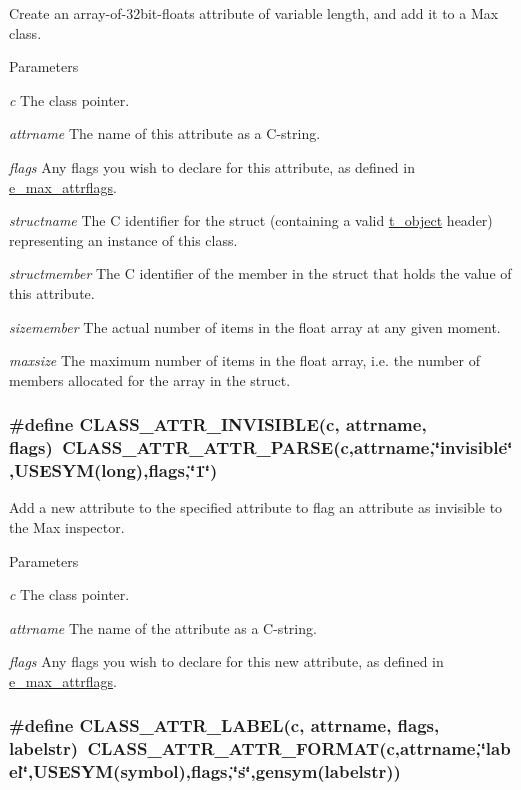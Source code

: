 Create an array-\/of-\/32bit-\/floats attribute of variable length, and add it to a Max class. 
\begin{DoxyParams}{Parameters}
\item[{\em c}]The class pointer. \item[{\em attrname}]The name of this attribute as a C-\/string. \item[{\em flags}]Any flags you wish to declare for this attribute, as defined in \hyperlink{group__attr_gaf296cfc6741bb19207f6ed8062809115}{e\_\-max\_\-attrflags}. \item[{\em structname}]The C identifier for the struct (containing a valid \hyperlink{structt__object}{t\_\-object} header) representing an instance of this class. \item[{\em structmember}]The C identifier of the member in the struct that holds the value of this attribute. \item[{\em sizemember}]The actual number of items in the float array at any given moment. \item[{\em maxsize}]The maximum number of items in the float array, i.e. the number of members allocated for the array in the struct. \end{DoxyParams}
\hypertarget{group__attr_ga764637d4034e5ce81cf523f5b69c102b}{
\subsubsection[{CLASS\_\-ATTR\_\-INVISIBLE}]{\setlength{\rightskip}{0pt plus 5cm}\#define CLASS\_\-ATTR\_\-INVISIBLE(c, \/  attrname, \/  flags)~CLASS\_\-ATTR\_\-ATTR\_\-PARSE(c,attrname,\char`\"{}invisible\char`\"{},USESYM(long),flags,\char`\"{}1\char`\"{})}}
\label{group__attr_ga764637d4034e5ce81cf523f5b69c102b}


Add a new attribute to the specified attribute to flag an attribute as invisible to the Max inspector. 
\begin{DoxyParams}{Parameters}
\item[{\em c}]The class pointer. \item[{\em attrname}]The name of the attribute as a C-\/string. \item[{\em flags}]Any flags you wish to declare for this new attribute, as defined in \hyperlink{group__attr_gaf296cfc6741bb19207f6ed8062809115}{e\_\-max\_\-attrflags}. \end{DoxyParams}
\hypertarget{group__attr_gad46aeee11e8b4786332ce4ff43963326}{
\subsubsection[{CLASS\_\-ATTR\_\-LABEL}]{\setlength{\rightskip}{0pt plus 5cm}\#define CLASS\_\-ATTR\_\-LABEL(c, \/  attrname, \/  flags, \/  labelstr)~CLASS\_\-ATTR\_\-ATTR\_\-FORMAT(c,attrname,\char`\"{}label\char`\"{},USESYM(symbol),flags,\char`\"{}s\char`\"{},gensym(labelstr))}}
\label{group__attr_gad46aeee11e8b4786332ce4ff43963326}


